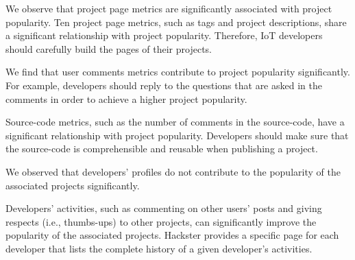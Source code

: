\noindent\textit{\RQone}


We observe that project page metrics are significantly associated with project
popularity. Ten project page metrics, such as tags and project descriptions,
share a significant relationship with project popularity. Therefore, IoT
developers should carefully build the pages of their projects.

\vspace{0.1cm}

\noindent\textit{\RQtwo}

We find that user comments metrics contribute to project popularity
significantly.  For example, developers should reply to the questions that are
asked in the comments in order to achieve a higher project popularity.

\vspace{0.1cm}

\noindent\textit{\RQthree}

Source-code metrics, such as the number of comments in the source-code, have a
significant relationship with project popularity. Developers should make sure
that the source-code is comprehensible and reusable when publishing a project.

\vspace{0.1cm}

\noindent\textit{\RQfour}

We observed that developers' profiles do not contribute to the popularity of the associated projects significantly.

\vspace{0.1cm}

\noindent\textit{\RQfive}

Developers' activities, such as commenting on other users' posts and giving respects (i.e., thumbs-ups) to other projects, can significantly improve the popularity of the associated projects. Hackster provides a specific page for each developer that lists the complete history of a given developer's activities.

\vspace{0.1cm}

%
%


